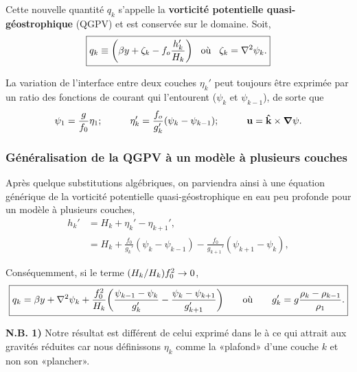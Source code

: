 \documentclass[10pt]{article}
\numberwithin{equation}{section}
\newcommand{\kvf}{\vb{\hat{k}}}
\begin{document}
Cette nouvelle quantité \(q_k\) s'appelle la \textbf{vorticité potentielle quasi-géostrophique} (QGPV) et est conservée sur le domaine.
Soit,
\begin{equation}
\label{eq:orgfda14bf}
\boxed{q_k \equiv \qty( \beta  y + \zeta_k - f_o \frac{h_k'}{H_k})
\hspace{0.3cm} \text{où} \hspace{0.3cm}
\zeta_k = \laplacian \psi_k.}
\end{equation}

La variation de l'interface entre deux couches \(\eta_k'\) peut toujours être exprimée par un ratio des fonctions de courant qui l'entourent (\(\psi_{k}\) et \(\psi_{k-1}\)), de sorte que 
\begin{equation}
\psi_1 = \frac{g}{f_0} \eta_1; 
\hspace{1cm} \eta_k' = \frac{f_o}{g_k'} \qty(\psi_k - \psi_{k-1});
\hspace{1cm} \vb{u} = \kvf \times \gradient\psi.
\end{equation}

\subsubsection{Généralisation de la QGPV à un modèle à plusieurs couches}
\label{sec:org5754399}

Après quelque substitutions algébriques, on parviendra ainsi à une équation générique de la vorticité potentielle quasi-géostrophique en eau peu profonde pour un modèle à plusieurs couches,
\begin{align}
h_k' &= H_k + \eta_k' - \eta_{k+1}',\\
&= H_k + \frac{f_0}{g_k'} (\psi_k - \psi_{k-1}) - \frac{f_0}{g_{k+1}'} (\psi_{k+1} - \psi_k),
\end{align}

Conséquemment, si le terme \(\qty(H_k/H_k)f_0^2 \rightarrow 0\), 
\begin{equation}
\boxed{q_k  = \beta y + \laplacian \psi_k + \frac{f_0^2}{H_k} \qty(\frac{\psi_{k-1}-\psi_k}{g_k'} -  \frac{\psi_k - \psi_{k+1}}{g_{k+1}'})
\hspace{0.7cm} \text{où} \hspace{0.7cm}
g_k' = g \frac{\rho_k - \rho_{k-1}}{\rho_1}.}
\end{equation}

\textbf{N.B. 1)} Notre résultat est différent de celui exprimé dans le \autocite[, p.185]{vallis_2006} à ce qui attrait aux gravités réduites car nous définissons \(\eta_k\) comme la «plafond» d'une couche \(k\) et non son «plancher».\\[0pt]
\end{document}
